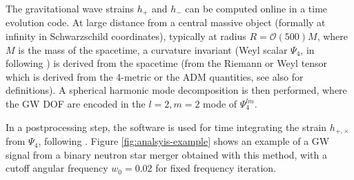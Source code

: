 The gravitational wave strains $h_+$ and $h_-$ can be computed online in a time
evolution code. At large distance from a central massive object (formally at
infinity in Schwarzschild coordinates), typically at radius $R = \mathcal O(500) M$,
where $M$ is the mass of the spacetime, a curvature invariant (Weyl scalar $\Psi_4$,
in  following \cite{Newman62a,Baker:2002qf}) is derived from the
spacetime (\ie from the Riemann or Weyl tensor which is derived from the
4-metric or the ADM quantities, see also \cite{Nerozzi:2004wv,Burko:2005fa} for definitions).
A spherical harmonic mode decomposition is
then performed, where the GW DOF are encoded in the $l=2, m=2$ mode of $\Psi_4^{lm}$.

In a postprocessing step, the  software is used for time integrating
the strain $h_{+,\times}$ from $\Psi_4$, following \cite{Reisswig:2011}.
Figure \vref{fig:analsyis-example} shows an example of a GW signal from a binary neutron
star merger obtained with this method, with a cutoff angular frequency $w_0=0.02$ for
fixed frequency iteration.




